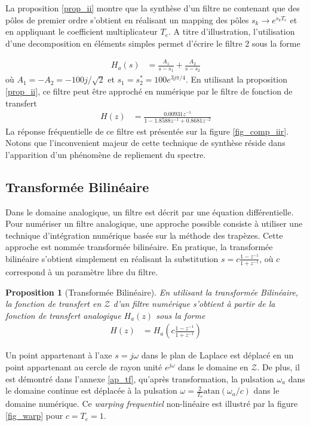 \documentclass[11pt,a4paper]{IEEEtran}
\newtheorem{proposition}{Proposition}
\begin{document}
La proposition \ref{prop_ii} montre que la synthèse d'un filtre ne contenant que des pôles de premier ordre s'obtient en réalisant un mapping des pôles $s_k \to e^{s_kT_e}$ et en appliquant le coefficient multiplicateur $T_e$. A titre d'illustration, l'utilisation d'une decomposition en éléments simples permet d'écrire le filtre 2 sous la forme

\begin{align*}
H_a(s)&=\frac{A_1}{s-s_1}+\frac{A_2}{s-s_2}
\end{align*}
où $A_1=-A_2=-100j/\sqrt{2}$ et $s_1=s_2^*=100e^{3j\pi/4}$. En utilisant la proposition \ref{prop_ii}, ce filtre peut être approché en numérique par le filtre de fonction de transfert
\begin{align*}
H(z)&=\frac{0.00931z^{-1}}{1-1.8588z^{-1}+0.8681z^{-2}}
\end{align*}
La réponse fréquentielle de ce filtre est présentée sur la figure \ref{fig_comp_iir}. Notons que l'inconvenient majeur de cette technique de synthèse réside dans l'apparition d'un phénomène de repliement du spectre.

\subsection{Transformée Bilinéaire}
Dans le domaine analogique, un filtre est décrit par une équation différentielle. Pour numériser un filtre analogique, une approche possible consiste à utiliser une technique d'intégration numérique basée sur la méthode des trapèzes. Cette approche est nommée transformée bilinéaire. En pratique, la transformée bilinéaire s'obtient simplement en réalisant la substitution $s=c\frac{1-z^{-1}}{1+z^{-1}}$, où $c$ correspond à un paramètre libre du filtre. 

\begin{proposition}[Transformée Bilinéaire] En utilisant la transformée Bilinéaire, la fonction de transfert en $\mathcal{Z}$ d'un filtre numérique s'obtient à partir de la fonction de transfert analogique $H_a(z)$ sous la forme
\begin{align}
H(z)&=H_a\left(c\frac{1-z^{-1}}{1+z^{-1}}\right)
\end{align}
\end{proposition}
Un point appartenant à l'axe $s=j\omega$ dans le plan de Laplace est déplacé en un point appartenant au cercle de rayon unité $e^{j\omega}$ dans le domaine en $\mathcal{Z}$. De plus, il est démontré dans l'annexe \ref{ap_tf}, qu'après transformation, la pulsation $\omega_a$ dans le domaine continue est déplacée à la pulsation $\omega=\frac{2}{T_e}\textrm{atan}(\omega_a/c)$ dans le domaine numérique. Ce \textit{warping frequentiel} non-linéaire est illustré par la figure \ref{fig_warp} pour $c=T_e=1$. 
\end{document}
